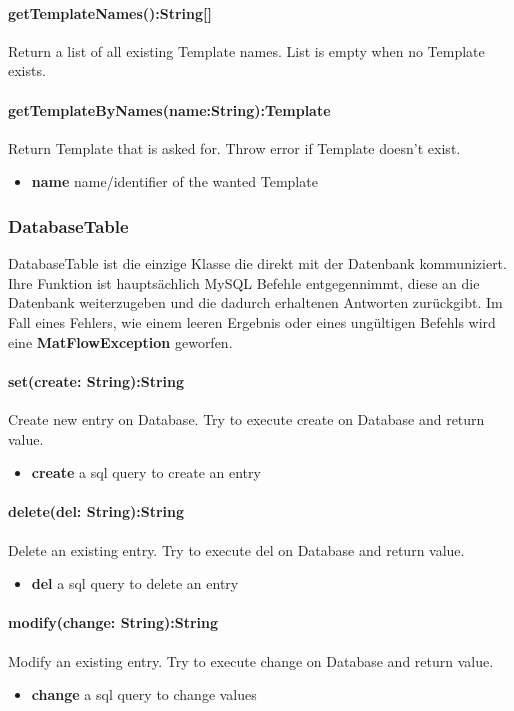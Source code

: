 \paragraph{getTemplateNames():String[]}
Return a list of all existing Template names.
List is empty when no Template exists.

\paragraph{getTemplateByNames(name:String):Template}
Return Template that is asked for.
Throw error if Template doesn't exist.
\begin{itemize}
	\item \textbf{name}
	name/identifier of the wanted Template
\end{itemize}



\subsubsection{DatabaseTable}
DatabaseTable ist die einzige Klasse die direkt mit der Datenbank kommuniziert. Ihre Funktion ist hauptsächlich MySQL Befehle entgegennimmt, diese an die Datenbank weiterzugeben und die dadurch erhaltenen Antworten zurückgibt. Im Fall eines Fehlers, wie einem leeren Ergebnis oder eines ungültigen Befehls wird eine \textbf{MatFlowException} geworfen.

\paragraph{set(create: String):String} Create new entry on Database. Try to execute create on Database and return value.
\begin{itemize}
	\item \textbf{create} 
	a sql query to create an entry
\end{itemize}

\paragraph{delete(del: String):String} Delete an existing entry. Try to execute del on Database and return value.
\begin{itemize}
	\item \textbf{del} 
	a sql query to delete an entry
\end{itemize}

\paragraph{modify(change: String):String} Modify an existing entry. Try to execute change on Database and return value.
\begin{itemize}
	\item \textbf{change} 
	a sql query to change values
\end{itemize}


\newpage